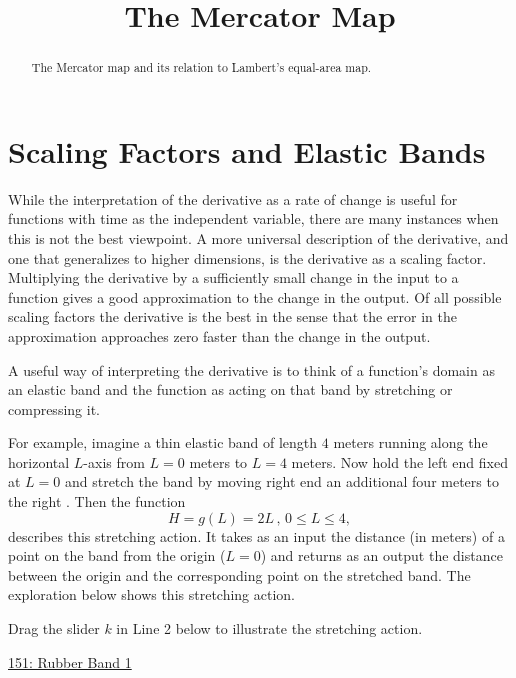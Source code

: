 \documentclass{ximera}
\title{The Mercator Map}
\begin{document}
\begin{abstract}
The Mercator map and its relation to Lambert's equal-area map.
\end{abstract}
\maketitle

\section{Scaling Factors and Elastic Bands}
While the interpretation of the derivative as a rate of change is useful for functions with time as the independent variable, there are many instances when this is not the best viewpoint. A more universal description of the derivative, and one that generalizes to higher dimensions, is the derivative as a scaling factor. Multiplying the derivative by a sufficiently small change in the input to a function gives a good approximation to the change in the output. Of all possible scaling factors the derivative is the best in the sense that the error in the approximation approaches zero faster than the change in the output.

A useful way of interpreting the derivative is to think of a function's domain as an elastic band and the function as acting on that band by stretching or compressing it.

For example, imagine a thin elastic band of length $4$ meters running along the horizontal $L$-axis from $L=0$ meters to $L=4$ meters.  Now hold the left end fixed at $L=0$ and stretch the band by moving right end an additional four meters to the right . Then the function
\[
      H = g(L) = 2L \, , \, 0\leq L \leq 4 ,
\]
describes this stretching action. It takes as an input the distance (in meters) of a point on the band from the origin ($L=0$) and returns as an output the distance between the origin and the corresponding point on the stretched band. The exploration below shows this stretching action.

\begin{exploration} \label{Ex:98f3rgafgbb}
Drag the slider $k$ in Line 2 below to illustrate the stretching action.

\begin{onlineOnly}
    \begin{center}
\end{center}
\end{onlineOnly}

\href{https://www.desmos.com/calculator/qejivz36ui}{151: Rubber Band 1}

\end{exploration}
\end{document}
